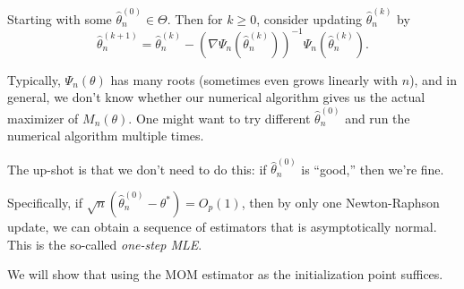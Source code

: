 \begin{prev}
	Starting with some \(\hat{\theta} _n^{(0)} \in \Theta \). Then for \(k \geq 0\), consider updating \(\hat{\theta} _n^{(k)}\) by
	\[
		\hat{\theta} _n^{(k+1)}
		= \hat{\theta} _n^{(k)} - \left( \nabla \Psi _n(\hat{\theta} _n^{(k)}) \right) ^{-1} \Psi _n(\hat{\theta} _n^{(k)}).
	\]
\end{prev}

Typically, \(\Psi _n(\theta )\) has many roots (sometimes even grows linearly with \(n\)), and in general, we don't know whether our numerical algorithm gives us the actual maximizer of \(M_n(\theta )\). One might want to try different \(\hat{\theta} _n^{(0)}\) and run the numerical algorithm multiple times.

\begin{intuition}
	The up-shot is that we don't need to do this: if \(\hat{\theta} _n^{(0)}\) is ``good,'' then we're fine.
\end{intuition}

Specifically, if \(\sqrt{n} (\hat{\theta} _n^{(0)} - \theta ^{\ast} ) = O_p(1)\), then by only one Newton-Raphson update, we can obtain a sequence of estimators that is asymptotically normal. This is the so-called \emph{one-step MLE}.

\begin{note}
	We will show that using the MOM estimator as the initialization point suffices.
\end{note}